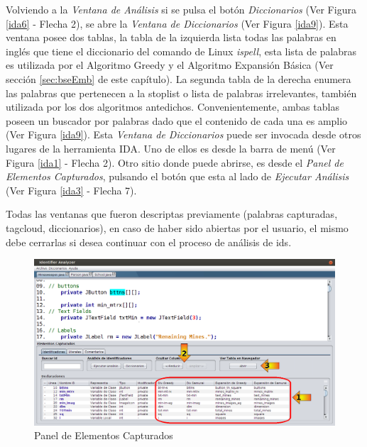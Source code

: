 Volviendo a la \textit{Ventana de Análisis} si se pulsa el botón \textit{Diccionarios} (Ver Figura \ref{ida6} - Flecha 2), se abre la \textit{Ventana de Diccionarios} (Ver Figura \ref{ida9}). Esta ventana posee dos tablas, la tabla de la izquierda lista todas las palabras en inglés que tiene el diccionario del comando de Linux \textit{ispell}, esta lista de palabras es utilizada por el Algoritmo Greedy y el Algoritmo Expansión Básica (Ver sección \ref{sec:bseEmb} de este capítulo). La segunda tabla de la derecha enumera las palabras que pertenecen a la stoplist o lista de palabras irrelevantes, también utilizada por los dos algoritmos antedichos. Convenientemente, ambas tablas poseen un buscador por palabras dado que el contenido de cada una es amplio (Ver Figura \ref{ida9}). Esta \textit{Ventana de Diccionarios} puede ser invocada desde otros lugares de la herramienta IDA. Uno de ellos es desde la barra de menú (Ver Figura \ref{ida1} - Flecha 2). Otro sitio donde puede abrirse, es desde el \textit{Panel de Elementos Capturados}, pulsando el botón que esta al lado de \textit{Ejecutar Análisis} (Ver Figura \ref{ida3} - Flecha 7).

Todas las ventanas que fueron descriptas previamente (palabras capturadas, tagcloud, diccionarios), en caso de haber sido abiertas por el usuario, el mismo debe cerrarlas si desea continuar con el proceso de análisis de ids.

\begin{figure}[t!] %
\centerline{%
\includegraphics[scale= 0.42]{./cap4/ida_10.png}
}
\caption{Panel de Elementos Capturados}
\label{ida10}
\end{figure}

